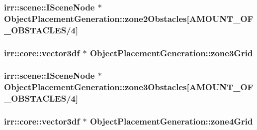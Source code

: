\hypertarget{class_object_placement_generation_aaa6c6df1104c971c4879534da1e0df7e}{
\subsubsection[{zone2\-Obstacles}]{\setlength{\rightskip}{0pt plus 5cm}irr\-::scene\-::\-I\-Scene\-Node $\ast$ Object\-Placement\-Generation\-::zone2\-Obstacles\mbox{[}{\bf A\-M\-O\-U\-N\-T\-\_\-\-O\-F\-\_\-\-O\-B\-S\-T\-A\-C\-L\-E\-S}/4\mbox{]}\hspace{0.3cm}{\ttfamily [private]}}}\label{class_object_placement_generation_aaa6c6df1104c971c4879534da1e0df7e}
\hypertarget{class_object_placement_generation_ad315e69d1bbacdfc0c3dfabcc02511b0}{
\subsubsection[{zone3\-Grid}]{\setlength{\rightskip}{0pt plus 5cm}irr\-::core\-::vector3df $\ast$ Object\-Placement\-Generation\-::zone3\-Grid\hspace{0.3cm}{\ttfamily [private]}}}\label{class_object_placement_generation_ad315e69d1bbacdfc0c3dfabcc02511b0}
\hypertarget{class_object_placement_generation_a7c3f0562182ea4b6553ff08926b7dd90}{
\subsubsection[{zone3\-Obstacles}]{\setlength{\rightskip}{0pt plus 5cm}irr\-::scene\-::\-I\-Scene\-Node $\ast$ Object\-Placement\-Generation\-::zone3\-Obstacles\mbox{[}{\bf A\-M\-O\-U\-N\-T\-\_\-\-O\-F\-\_\-\-O\-B\-S\-T\-A\-C\-L\-E\-S}/4\mbox{]}\hspace{0.3cm}{\ttfamily [private]}}}\label{class_object_placement_generation_a7c3f0562182ea4b6553ff08926b7dd90}
\hypertarget{class_object_placement_generation_a1422711f765890659a9fb0250a8e693c}{
\subsubsection[{zone4\-Grid}]{\setlength{\rightskip}{0pt plus 5cm}irr\-::core\-::vector3df $\ast$ Object\-Placement\-Generation\-::zone4\-Grid\hspace{0.3cm}{\ttfamily [private]}}}\label{class_object_placement_generation_a1422711f765890659a9fb0250a8e693c}
